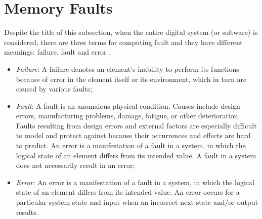 \section{Memory Faults}

Despite the title of this subsection, when the entire digital system (or software) is considered, there are three terms for computing fault and they have different meanings: failure, fault and error \cite{Nelson1990}. 

\begin{itemize}
    \item \textit{Failure}: A failure denotes an element's inability to perform its functions because of error in the element itself or its environment, which in turn are caused by various faults;
    \item \textit{Fault}: A fault is an anomalous physical condition. Causes include design errors, manufacturing problems, damage, fatigue, or other deterioration. Faults resulting from design errors and external factors are especially difficult to model and protect against because their occurrences and effects are hard to predict. An error is a manifestation of a fault in a system, in which the logical state of an element differs from its intended value. A fault in a system does not necessarily result in an error;
    \item \textit{Error}: An error is a manifestation of a fault in a system, in which the logical state of an element differs from its intended value. An error occurs for a particular system state and input when an incorrect next state and/or output results.
\end{itemize}